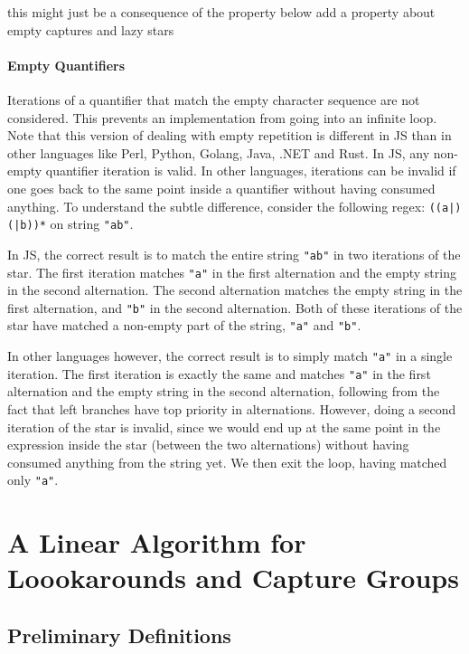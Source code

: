 \documentclass{article}
\def\regex#1{\lstinline[style=rgx]{#1}}
\def\todo#1{{\color{ACMOrange}{TODO: }}#1}
\def\str#1{\texttt{"#1"}}
\begin{document}
\todo{this might just be a consequence of the property below}
\todo{add a property about empty captures and lazy stars}

\paragraph{Empty Quantifiers}
Iterations of a quantifier that match the empty character sequence are not considered.
This prevents an implementation from going into an infinite loop.
Note that this version of dealing with empty repetition is different in JS than in other languages like Perl, Python, Golang, Java, .NET and Rust.
In JS, any non-empty quantifier iteration is valid.
In other languages, iterations can be invalid if one goes back to the same point inside a quantifier without having consumed anything.
To understand the subtle difference, consider the following regex: \regex{((a|)(|b))*} on string \str{ab}.

In JS, the correct result is to match the entire string \str{ab} in two iterations of the star.
The first iteration matches \str{a} in the first alternation and the empty string in the second alternation.
The second alternation matches the empty string in the first alternation, and \str{b} in the second alternation.
Both of these iterations of the star have matched a non-empty part of the string, \str{a} and \str{b}.

In other languages however, the correct result is to simply match \str{a} in a single iteration.
The first iteration is exactly the same and matches \str{a} in the first alternation and the empty string in the second alternation, following from the fact that left branches have top priority in alternations.
However, doing a second iteration of the star is invalid, since we would end up at the same point in the expression inside the star (between the two alternations) without having consumed anything from the string yet.
We then exit the loop, having matched only \str{a}.





\section{A Linear Algorithm for Loookarounds and Capture Groups}

\subsection{Preliminary Definitions}
\end{document}
